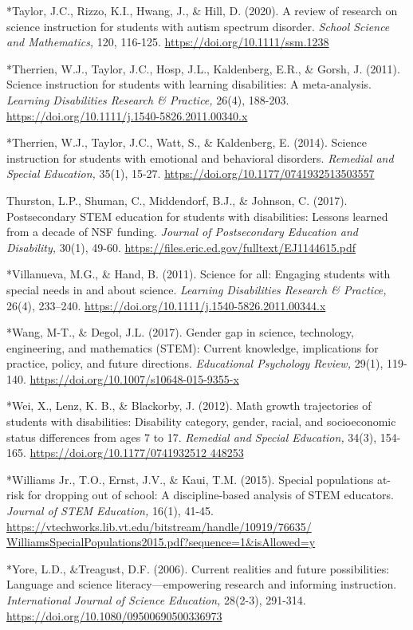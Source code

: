\documentclass[11.5pt]{sig-alternate}
\begin{document}
*Taylor, J.C., Rizzo, K.I., Hwang, J., \& Hill, D. (2020). A review of research on science instruction for students with autism spectrum disorder. \textit{School Science and Mathematics,} 120, 116-125. \url{https://doi.org/10.1111/ssm.1238}

*Therrien, W.J., Taylor, J.C., Hosp, J.L., Kaldenberg, E.R., \& Gorsh, J. (2011). Science instruction for students with learning disabilities: A meta-analysis. \textit{Learning Disabilities Research \& Practice,} 26(4), 188-203. \url{https://doi.org/10.1111/j.1540-5826.2011.00340.x}

*Therrien, W.J., Taylor, J.C., Watt, S., \& Kaldenberg, E. (2014). Science instruction for students with emotional and behavioral disorders. \textit{Remedial and Special Education,} 35(1), 15-27. \url{https://doi.org/10.1177/0741932513503557}

Thurston, L.P., Shuman, C., Middendorf, B.J., \& Johnson, C. (2017). Postsecondary STEM education for students with disabilities: Lessons learned from a decade of NSF funding.\textit{ Journal of Postsecondary Education and Disability,} 30(1), 49-60. 
\url{https://files.eric.ed.gov/fulltext/EJ1144615.pdf}

*Villanueva, M.G., \& Hand, B. (2011). Science for all: Engaging students with special needs in and about science. \textit{Learning Disabilities Research \& Practice,} 26(4), 233–240. \url{https://doi.org/10.1111/j.1540-5826.2011.00344.x}

*Wang, M-T., \& Degol, J.L. (2017). Gender gap in science, technology, engineering, and mathematics (STEM): Current knowledge, implications for practice, policy, and future directions. \textit{Educational Psychology Review,} 29(1), 119-140. \url{https://doi.org/10.1007/s10648-015-9355-x}

*Wei, X., Lenz, K. B., \& Blackorby, J. (2012). Math growth trajectories of students with disabilities: Disability category, gender, racial, and socioeconomic status differences from ages 7 to 17. \textit{Remedial and Special Education,} 34(3), 154-165. \url{https://doi.org/10.1177/0741932512 448253}

*Williams Jr., T.O., Ernst, J.V., \& Kaui, T.M. (2015). Special populations at-risk for dropping out of school: A discipline-based analysis of STEM educators. \textit{Journal of STEM Education,} 16(1), 41-45. \url{https://vtechworks.lib.vt.edu/bitstream/handle/10919/76635/ WilliamsSpecialPopulations2015.pdf?sequence=1\&isAllowed=y}

*Yore, L.D., \&Treagust, D.F. (2006). Current realities and future possibilities: Language and science literacy—em\-powering research and informing instruction. \textit{International Journal of Science Education,} 28(2-3), 291-314. \url{https://doi.org/10.1080/09500690500336973}
 
\end{document}
